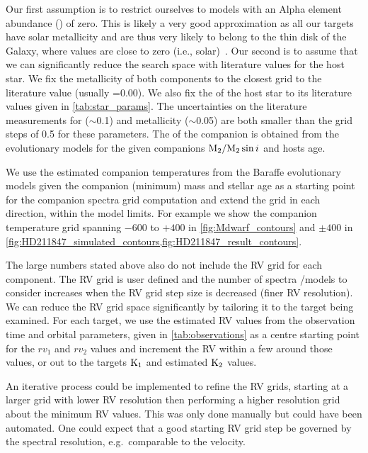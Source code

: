 Our first assumption is to restrict ourselves to models with an Alpha element abundance (\alphafe{}) of zero.
This is likely a very good approximation as all our targets have solar metallicity and are thus very likely to belong to the thin disk of the Galaxy, where \alphafe{} values are close to zero (i.e., solar)~\citet[e.g.]{adibekyan_chemical_2012}.
Our second is to assume that we can significantly reduce the search space with literature values for the host star.
We fix the metallicity of both components to the closest grid to the literature value (usually \feh{}=0.00).
We also fix the \logg{} of the host star to its literature values given in \cref{tab:star_params}.
The uncertainties on the literature measurements for \logg{} (\(\sim\)0.1) and metallicity (\(\sim\)0.05) are both smaller than the grid steps of 0.5 for these parameters.
The \logg{} of the companion is obtained from the~\citet{baraffe_evolutionary_2003,baraffe_new_2015} evolutionary models for the given companions \(\textrm{M}_{2}/\textrm{M}_{2}\sin{i}\) and hosts age.

We use the estimated companion temperatures from the Baraffe evolutionary models given the companion (minimum) mass and stellar age as a starting point for the companion spectra grid computation and extend the grid in each direction, within the model limits.
For example we show the companion temperature grid spanning \(-600\) to \(+400\)\K{} in \cref{fig:Mdwarf_contours} and \(\pm400\)\K{} in \cref{fig:HD211847_simulated_contours,fig:HD211847_result_contours}.

The large numbers stated above also do not include the {RV} grid for each component.
The {RV} grid is user defined and the number of spectra /models to consider increases when the {RV} grid step size is decreased (finer {RV} resolution).
We can reduce the {RV} grid space significantly by tailoring it to the target being examined.
For each target, we use the estimated {RV} values from the observation time and orbital parameters, given in \cref{tab:observations} as a centre starting point for the \({rv}_1\) and \({rv}_2\) values and increment the {RV} within a few {\fwhm} around those values, or out to the targets \(\rm K_1\) and estimated \(\rm K_2\) values.

An iterative process could be implemented to refine the {RV} grids, starting at a larger grid with lower {RV} resolution then performing a higher resolution grid about the minimum \textchisquared{} {RV} values.
This was only done manually but could have been automated.
One could expect that a good starting {RV} grid step be governed by the spectral resolution, e.g.\ comparable to the {\fwhm} velocity.

